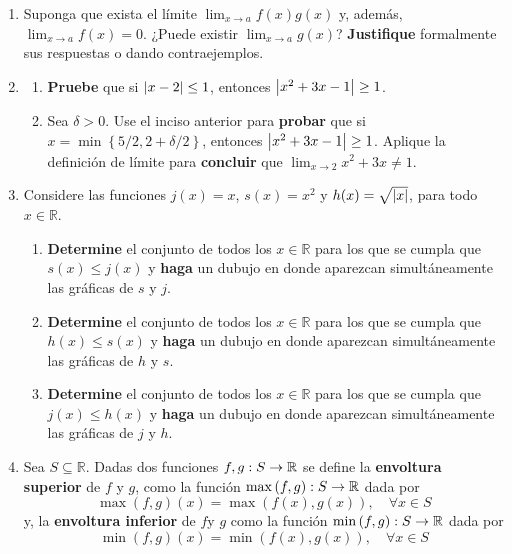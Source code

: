\documentclass[12pt]{article}
\begin{document}
\begin{enumerate}
    \item Suponga que exista el límite $\lim_{x\rightarrow a}f(x)g(x)$ y, además, $\lim_{x\rightarrow a}f(x)=0$. ¿Puede existir $\lim_{x\rightarrow a}g(x)$? \textbf{Justifique} formalmente sus respuestas o dando contraejemplos.
    \item \begin{enumerate}
        \item \textbf{Pruebe} que si $\left| x-2 \right|\leq1$, entonces $\left| x^2+3x-1 \right|\geq1$.
        \item Sea $\delta>0$. Use el inciso anterior para \textbf{probar} que si $x=\min\left\{5/2,2+\delta/2 \right\}$, entonces $\left| x^2+3x-1 \right|\geq1$. Aplique la definición de límite para \textbf{concluir} que $\lim_{x\rightarrow2}x^2+3x\neq1$.
    \end{enumerate}
    \item Considere las funciones $j(x)=x$, $s(x)=x^2$ y $h(x)=\sqrt{\left| x \right|}$, para todo $x\in\mathbb{R}$.
    \begin{enumerate}
        \item \textbf{Determine} el conjunto de todos los $x\in\mathbb{R}$ para los que se cumpla que $s(x)\leq j(x)$ y \textbf{haga} un dubujo en donde aparezcan simultáneamente las gráficas de $s$ y $j$.
        \item \textbf{Determine} el conjunto de todos los $x\in\mathbb{R}$ para los que se cumpla que $h(x)\leq s(x)$ y \textbf{haga} un dubujo en donde aparezcan simultáneamente las gráficas de $h$ y $s$.
        \item \textbf{Determine} el conjunto de todos los $x\in\mathbb{R}$ para los que se cumpla que $j(x)\leq h(x)$ y \textbf{haga} un dubujo en donde aparezcan simultáneamente las gráficas de $j$ y $h$.
    \end{enumerate}
    \item Sea $S\subseteq\mathbb{R}$. Dadas dos funciones $f,g:S\rightarrow\mathbb{R}$ se define la \textbf{envoltura superior} de $f$ y $g$, como la función $\max\left(f,g\right):S\rightarrow\mathbb{R}$ dada por
    \begin{equation*}
        \max\left(f,g\right)(x)=\max\left(f(x),g(x)\right),\quad\forall x\in S
    \end{equation*}
    y, la \textbf{envoltura inferior} de $f$y $g$ como la función $\min\left(f,g\right):S\rightarrow\mathbb{R}$ dada por
    \begin{equation*}
        \min\left(f,g\right)(x)=\min\left(f(x),g(x)\right),\quad\forall x\in S
    \end{equation*}

\end{enumerate}
\end{document}
